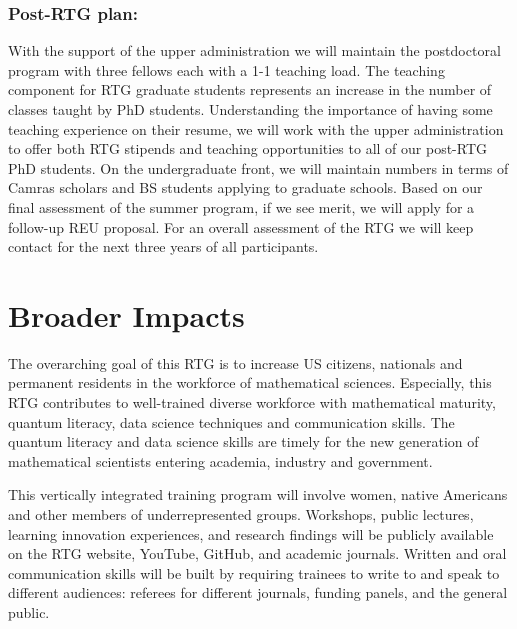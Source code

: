 \documentclass[11pt]{NSFamsart}
\begin{document}
 \subsubsection*{Post-RTG plan:}
With the support of the upper administration we will maintain the postdoctoral program with three
fellows each with a 1-1 teaching load. The teaching component for RTG graduate students represents
an increase in the number of classes taught by PhD students. Understanding the importance of having
some teaching experience on their resume, we will work with the upper administration to offer both RTG
stipends and teaching opportunities to all of our post-RTG PhD students. On the undergraduate front, we
will maintain numbers in terms of Camras scholars and BS students applying to graduate schools. Based on
our final assessment of the summer program, if we see merit, we will apply for a follow-up REU proposal.
For an overall assessment of the RTG we will keep contact for the next three years of all participants.


\section{Broader Impacts} 

 

The overarching goal of this RTG is to increase US citizens, nationals and permanent residents in the workforce of  mathematical sciences. Especially, this RTG   contributes to  well-trained    diverse    workforce with mathematical maturity, quantum literacy,   data science techniques and communication skills.  The quantum literacy  and data science skills are   timely for the new  generation of mathematical scientists entering academia, industry and government.
   

This vertically integrated training program will involve women, native Americans and other members of underrepresented groups. Workshops, public lectures, learning innovation experiences, and research findings will be publicly available on the  RTG website, YouTube, GitHub, and academic journals. Written and oral communication skills will be built by requiring trainees to write to and speak to different audiences: referees for different journals, funding panels, and the general public. 
\end{document}
